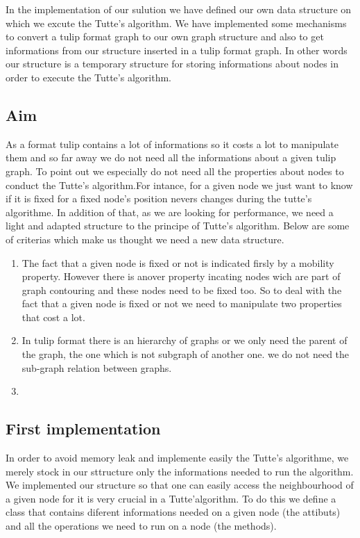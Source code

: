 In the implementation of our sulution we have defined our own data structure on which we excute the Tutte's algorithm. We have implemented some mechanisms to convert a tulip format graph to our own graph structure and also to get informations from our structure inserted in a tulip format graph. In other words our structure is a temporary structure for storing informations about nodes in order to execute the Tutte's algorithm.

\subsection{Aim}
As a format tulip contains a lot of informations so it costs a lot to manipulate them and so far away we do not need all the informations about a given tulip graph. To point out we especially do not need all the properties about nodes to conduct the Tutte's algorithm.For intance, for a given node we just want to know if it is fixed for a fixed node's position nevers changes during the tutte's algorithme. In addition of that, as we are looking for performance, we need a light and adapted structure to the principe of Tutte's algorithm. Below are some of criterias which make us thought we need a new data structure.
\begin{enumerate}
\item The fact that a given node is fixed or not is indicated firsly by a mobility property. However there is anover property incating nodes wich are part of graph contouring and these nodes need to be fixed too. So to deal with the fact that a given node is fixed or not we need to manipulate two properties that cost a lot.

\item In tulip format there is an hierarchy of graphs or we only need
  the parent of the graph, the one which is not subgraph of another
  one. we do not need the sub-graph relation between graphs.

\item 

\end{enumerate}  

\subsection{First implementation}
In order to avoid memory leak and implemente easily the Tutte's
algorithme, we merely stock in our sttructure only the informations
needed to run the algorithm. We implemented our structure so that one
can easily access the neighbourhood of a given node for it is very
crucial in a Tutte'algorithm. To do this we define a class that
contains diferent informations needed on a given node (the attibuts)
and all the operations we need to run on a node (the methods).

